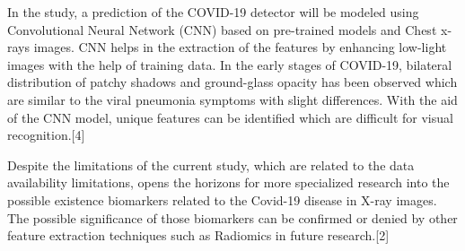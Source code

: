 \documentclass[12pt]{revtex4}
\begin{document}
In the study, a prediction of the COVID-19 detector will be modeled using Convolutional Neural Network (CNN) based on pre-trained models and Chest x-rays images. CNN helps in the extraction of the features by enhancing low-light images with the help of training data. In the early stages of COVID-19, bilateral distribution of patchy shadows and ground-glass opacity has been observed which are similar to the viral pneumonia symptoms with slight differences. With the aid of the CNN model, unique features can be identified which are difficult for visual recognition.[4]

Despite the limitations of the current study, which are related to the data availability limitations, opens the horizons for more specialized research into the possible existence biomarkers related to the Covid-19 disease in X-ray images. The possible significance of those biomarkers can be confirmed or denied by other feature extraction techniques such as Radiomics in future research.[2]


\pagebreak
\end{document}
